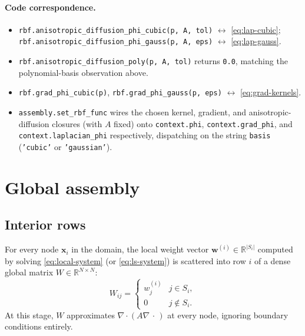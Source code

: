 \documentclass[11pt]{article}
\newcommand{\bx}{\mathbf{x}}
\newcommand{\bw}{\mathbf{w}}
\newcommand{\R}{\mathbb{R}}
\newcommand{\diver}{\nabla\!\cdot}
\newcommand{\grad}{\nabla}
\begin{document}
\paragraph{Code correspondence.}
\begin{itemize}[leftmargin=2em]
  \item \texttt{rbf.anisotropic\_diffusion\_phi\_cubic(p, A, tol)}
        $\leftrightarrow$ \eqref{eq:lap-cubic}; \\
        \texttt{rbf.anisotropic\_diffusion\_phi\_gauss(p, A, eps)}
        $\leftrightarrow$ \eqref{eq:lap-gauss}.
  \item \texttt{rbf.anisotropic\_diffusion\_poly(p, A, tol)} returns
        \texttt{0.0}, matching the polynomial-basis observation above.
  \item \texttt{rbf.grad\_phi\_cubic(p)}, \texttt{rbf.grad\_phi\_gauss(p, eps)}
        $\leftrightarrow$ \eqref{eq:grad-kernels}.
  \item \texttt{assembly.set\_rbf\_func} wires the chosen kernel,
        gradient, and anisotropic-diffusion closures (with $A$ fixed)
        onto \texttt{context.phi}, \texttt{context.grad\_phi}, and
        \texttt{context.laplacian\_phi} respectively, dispatching on
        the string \texttt{basis} (\texttt{'cubic'} or
        \texttt{'gaussian'}).
\end{itemize}

\section{Global assembly}

\subsection{Interior rows}

For every node $\bx_i$ in the domain, the local weight vector $\bw^{(i)}
\in \R^{|S_i|}$ computed by solving \eqref{eq:local-system} (or
\eqref{eq:ls-system}) is scattered into row $i$ of a dense global
matrix $W \in \R^{N \times N}$:
\begin{equation}
  W_{ij} =
  \begin{cases}
    w^{(i)}_{j} & j \in S_i, \\
    0 & j \notin S_i.
  \end{cases}
  \label{eq:global-W}
\end{equation}
At this stage, $W$ approximates $\diver(A\grad\,\cdot\,)$ at every node,
ignoring boundary conditions entirely.
\end{document}
